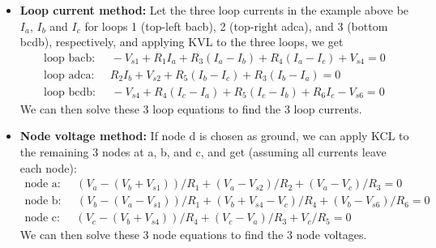 \documentclass{article}
\begin{document}
\begin{itemize}
\begin{comment}
\item {\bf Branch current method:}

  There are $n=4$ nodes (a,b,c,d) and $b=6$ branches in the circuit, 
  therefore we can get $n-1=4-1=3$ independent node equations (first
  three) and $b-(n-1)=6-3=3$ independent loop equations (second three):
  \begin{equation}
    \begin{array}{l}
    \mbox{node a:}\;\;\;\;\; I_1+I_2-I_3=0 	\\
    \mbox{node b:}\;\;\;\;\;-I_1-I_4-I_6=0 	\\
    \mbox{node d:}\;\;\;\;\;-I_2+I_5+I_6=0 	\\
    \mbox{loop 1:}\;\;\;\;\;-V_{s1}+I_1R_1+I_3R_3-I_4R_4+V_{s4}=0 \\
    \mbox{loop 2:}\;\;\;\;\;-I_2R_2+V_{s2}-I_5R_5-I_3R_3=0	 \\
    \mbox{loop 3:}\;\;\;\;\;-V_{s4}+I_4R_4+I_5R_5-I_6R_6-V_{s6}=0 
    \end{array} 
  \end{equation}
  Solving these 6 equations we get the 6 branch currents.
\end{comment}

\item {\bf Loop current method:}
  Let the three loop currents in the example above be $I_a$, $I_b$ and $I_c$ 
  for loops 1 (top-left bacb), 2 (top-right adca), and 3 (bottom bcdb),
  respectively, and applying KVL to the three loops, we get
  \begin{equation} 
    \begin{array}{l}
    \mbox{loop bacb:}\;\;\;\;\;-V_{s1}+R_1I_a+R_3(I_a-I_b)+R_4(I_a-I_c)+V_{s4}=0 \\
    \mbox{loop adca:}\;\;\;\;\;R_2I_b+V_{s2}+R_5(I_b-I_c)+R_3(I_b-I_a)=0 \\
    \mbox{loop bcdb:}\;\;\;\;\;-V_{s4}+R_4(I_c-I_a)+R_5(I_c-I_b)+R_6I_c-V_{s6}=0 
    \end{array} 
  \end{equation}
  We can then solve these 3 loop equations to find the 3 loop currents.

\item {\bf Node voltage method:}
  If node d is chosen as ground, we can apply KCL to the remaining 3 nodes 
  at a, b, and c, and get (assuming all currents leave each node):
  \begin{equation} 
    \begin{array}{l}
    \mbox{node a:}\;\;\;\;\;(V_a-(V_b+V_{s1}))/R_1+(V_a-V_{s2})/R_2+(V_a-V_c)/R_3=0 \\
    \mbox{node b:}\;\;\;\;\;(V_b-(V_a-V_{s1}))/R_1+(V_b+V_{s4}-V_c)/R_4+(V_b-V_{s6})/R_6=0 \\
    \mbox{node c:}\;\;\;\;\;(V_c-(V_b+V_{s4}))/R_4+(V_c-V_a)/R_3+V_c/R_5=0 
    \end{array} 
  \end{equation}
  We can then solve these 3 node equations to find the 3 node voltages.

\end{itemize}
\end{document}
